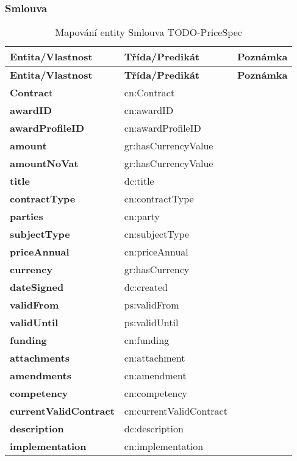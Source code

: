 \subsubsection*{Smlouva}

\begin{center}
\begin{longtable}{lll}
\label{grid_mlmmh} \\
\multicolumn{1}{l}{\textbf{Entita/Vlastnost}} & 
\multicolumn{1}{l}{\textbf{Třída/Predikát}} & 
\multicolumn{1}{l}{\textbf{Poznámka}} \\ \hline 
\endfirsthead
\multicolumn{1}{l}{\textbf{Entita/Vlastnost}} & 
\multicolumn{1}{l}{\textbf{Třída/Predikát}} & 
\multicolumn{1}{l}{\textbf{Poznámka}} \\ \hline 
\hline
\endhead
\endfoot
\caption{Mapování entity Smlouva TODO-PriceSpec}
\endlastfoot
\textbf{Contrac}t & cn:Contract \\
\textbf{awardID} & cn:awardID \\
\textbf{awardProfileID} & cn:awardProfileID \\
\textbf{amount} & gr:hasCurrencyValue \\
\textbf{amountNoVat} & gr:hasCurrencyValue \\
\textbf{title} & dc:title \\
\textbf{contractType} & cn:contractType \\
\textbf{parties} & cn:party \\
\textbf{subjectType} & cn:subjectType \\
\textbf{priceAnnual} & cn:priceAnnual \\
\textbf{currency} & gr:hasCurrency \\
\textbf{dateSigned} & dc:created \\
\textbf{validFrom} & ps:validFrom \\
\textbf{validUntil} & ps:validUntil \\
\textbf{funding} & cn:funding \\
\textbf{attachments} & cn:attachment \\
\textbf{amendments} & cn:amendment \\
\textbf{competency} & cn:competency \\
\textbf{currentValidContract} & cn:currentValidContract \\
\textbf{description} & dc:description \\
\textbf{implementation} & cn:implementation \\
\end{longtable}
\end{center}

